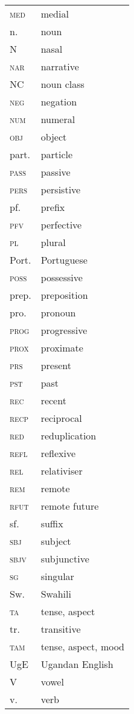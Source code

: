 \begin{tabularx}{.44\textwidth}{lQ}
\textsc{med} & medial\\
n. & noun\\
N & nasal\\
\textsc{nar} & narrative\\
NC & noun class\\
\textsc{neg} & negation\\
\textsc{num} & numeral\\
\textsc{obj} & object\\
part. & particle\\
\textsc{pass} & passive\\
\textsc{pers} & persistive\\
pf. & prefix\\
\textsc{pfv} & perfective\\
\textsc{pl} & plural\\
Port. & Portuguese\\
\textsc{poss} & possessive\\
prep. & preposition\\
pro. & pronoun\\
\textsc{prog} & progressive\\
\textsc{prox} & proximate\\
\textsc{prs} & present\\
\textsc{pst} & past\\
\textsc{rec} & recent\\
\textsc{recp} & reciprocal\\
\textsc{red} & reduplication\\
\textsc{refl} & reflexive\\
\textsc{rel} & relativiser\\
\textsc{rem } & remote\\
\textsc{rfut} & remote future\\
sf. & suffix\\
\textsc{sbj} & subject\\
\textsc{sbjv} & subjunctive\\
\textsc{sg} & singular\\
Sw. & Swahili\\
\textsc{ta} & tense, aspect\\
tr. & transitive\\
\textsc{tam} & tense, aspect, mood\\
UgE & Ugandan English\\
V & vowel\\
v. & verb\\
\end{tabularx}
